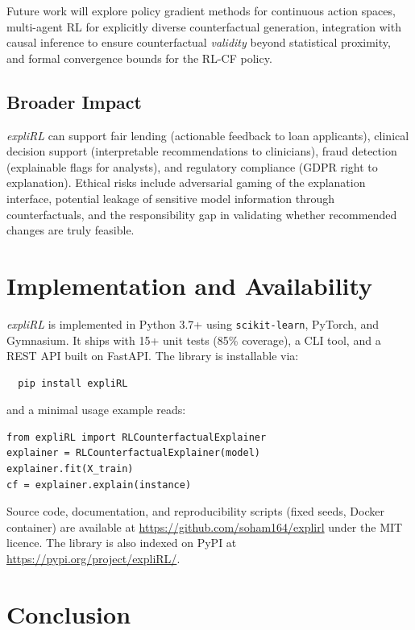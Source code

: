 \documentclass[conference]{IEEEtran}
\begin{document}
Future work will explore policy gradient methods for continuous action spaces,
multi-agent RL for explicitly diverse counterfactual generation, integration
with causal inference to ensure counterfactual \emph{validity} beyond statistical
proximity, and formal convergence bounds for the RL-CF policy.

\subsection{Broader Impact}

\emph{expliRL} can support fair lending (actionable feedback to loan applicants),
clinical decision support (interpretable recommendations to clinicians), fraud
detection (explainable flags for analysts), and regulatory compliance (GDPR
right to explanation). Ethical risks include adversarial gaming of the
explanation interface, potential leakage of sensitive model information through
counterfactuals, and the responsibility gap in validating whether recommended
changes are truly feasible.

\section{Implementation and Availability}
\label{sec:impl}

\emph{expliRL} is implemented in Python 3.7+ using \texttt{scikit-learn},
PyTorch, and Gymnasium. It ships with 15+ unit tests (85\% coverage), a CLI
tool, and a REST API built on FastAPI. The library is installable via:
\begin{verbatim}
  pip install expliRL
\end{verbatim}
and a minimal usage example reads:
\begin{verbatim}
from expliRL import RLCounterfactualExplainer
explainer = RLCounterfactualExplainer(model)
explainer.fit(X_train)
cf = explainer.explain(instance)
\end{verbatim}
Source code, documentation, and reproducibility scripts (fixed seeds, Docker
container) are available at \url{https://github.com/soham164/explirl} under the
MIT licence. The library is also indexed on PyPI at
\url{https://pypi.org/project/expliRL/}.

\section{Conclusion}
\label{sec:conclusion}
\end{document}
